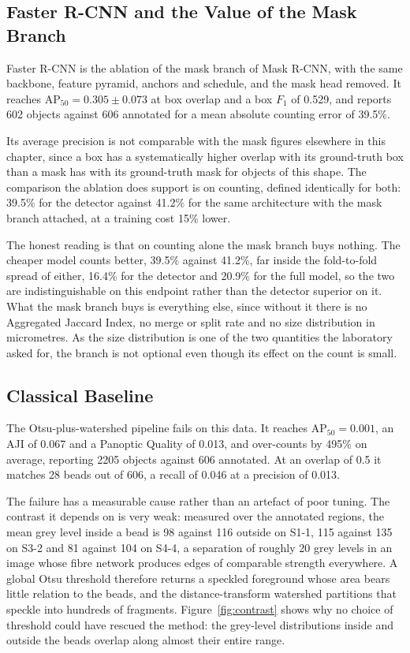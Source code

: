 \subsection{Faster R-CNN and the Value of the Mask Branch}
\label{sec:mask_branch}

Faster R-CNN is the ablation of the mask branch of Mask R-CNN, with the same
backbone, feature pyramid, anchors and schedule, and the mask head removed. It
reaches $\mathrm{AP}_{50} = 0.305 \pm 0.073$ at box overlap and a box $F_1$ of
0.529, and reports 602 objects against 606 annotated for a mean absolute counting
error of 39.5\%.

Its average precision is not comparable with the mask figures elsewhere in this
chapter, since a box has a systematically higher overlap with its ground-truth box
than a mask has with its ground-truth mask for objects of this shape. The
comparison the ablation does support is on counting, defined identically for both:
39.5\% for the detector against 41.2\% for the same architecture with the mask
branch attached, at a training cost 15\% lower.

The honest reading is that on counting alone the mask branch buys nothing. The
cheaper model counts better, 39.5\% against 41.2\%, far inside the fold-to-fold
spread of either, 16.4\% for the detector and 20.9\% for the full model, so the
two are indistinguishable on this endpoint rather than the detector superior on
it. What the mask branch buys is everything else, since without it there is no
Aggregated Jaccard Index, no merge or split rate and no size distribution in
micrometres. As the size distribution is one of the two quantities the laboratory
asked for, the branch is not optional even though its effect on the count is
small.

\subsection{Classical Baseline}

The Otsu-plus-watershed pipeline fails on this data. It reaches
$\mathrm{AP}_{50} = 0.001$, an AJI of 0.067 and a Panoptic Quality of 0.013, and
over-counts by 495\% on average, reporting 2205 objects against 606 annotated. At
an overlap of 0.5 it matches 28 beads out of 606, a recall of 0.046 at a precision
of 0.013.

The failure has a measurable cause rather than an artefact of poor tuning.
The contrast it depends on is very weak: measured over the annotated regions, the
mean grey level inside a bead is 98 against 116 outside on S1-1, 115 against 135
on S3-2 and 81 against 104 on S4-4, a separation of roughly 20 grey levels in an
image whose fibre network produces edges of comparable strength everywhere. A
global Otsu threshold therefore returns a speckled foreground whose area bears
little relation to the beads, and the distance-transform watershed partitions that
speckle into hundreds of fragments. Figure~\ref{fig:contrast} shows why no choice
of threshold could have rescued the method: the grey-level distributions inside
and outside the beads overlap along almost their entire range.

